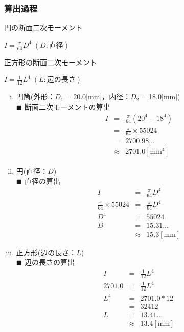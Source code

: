 \documentclass[twocolumn,a4j]{jsarticle}
\begin{document}
\subsubsection{算出過程}
\begin{itembox}[l]{円の断面二次モーメント}
    \begin{center}
        $\displaystyle I = \frac{\pi}{64}D^4\;\left(D:直径\right)$
    \end{center}
\end{itembox}
\begin{itembox}[l]{正方形の断面二次モーメント}
    \begin{center}
        $\displaystyle I = \frac{1}{12}L^4\;\left(L:辺の長さ\right)$
    \end{center}
\end{itembox}

\newpage

\begin{enumerate}[(i)]
    \item 円筒(外形：$D_1=$20.0[mm]，内径：$D_2=$18.0[mm])\\
          $\blacksquare$ 断面二次モーメントの算出
          \begin{eqnarray*}
              I &=& \frac{\pi}{64} \left(20^4 - 18^4\right)\\
              &=& \frac{\pi}{64} × 55024\\
              &=& 2700.98 \dots\\
              &\approx& 2701.0 \left[\mathrm{mm^4}\right]
          \end{eqnarray*}
    \item 円(直径：$D$)\\
          $\blacksquare$ 直径の算出
          \begin{eqnarray*}
              I &=& \frac{\pi}{64}D^4\\
              \frac{\pi}{64} × 55024 &=& \frac{\pi}{64}D^4\\
              D^4 &=& 55024\\
              D&=& 15.31\dots\\
              &\approx& 15.3 \left[\mathrm{mm}\right]
          \end{eqnarray*}
    \item 正方形(辺の長さ：$L$)\\
          $\blacksquare$ 辺の長さの算出
          \begin{eqnarray*}
              I &=& \frac{1}{12}L^4\\
              2701.0 &=& \frac{1}{12}L^4\\
              L^4 &=& 2701.0 * 12\\
              &=& 32412\\
              L&=& 13.41\dots\\
              &\approx& 13.4 \left[\mathrm{mm}\right]
          \end{eqnarray*}
\end{enumerate}
\end{document}
